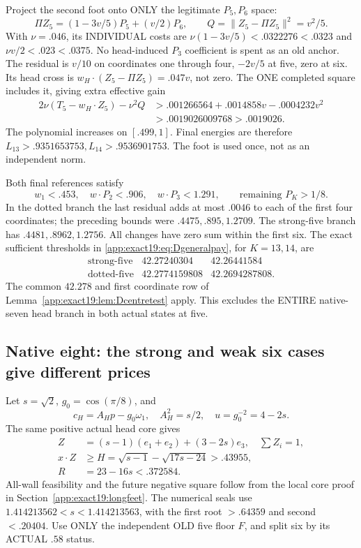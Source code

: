\documentclass[11pt]{article}
\theoremstyle{definition}
\theoremstyle{remark}
\begin{document}
Project the second foot onto ONLY the legitimate \(P_5,P_6\) space:
\[
 \Pi Z_5=(1-3v/5)P_5+(v/2)P_6,\qquad
                         Q=\|Z_5-\Pi Z_5\|^2=v^2/5 .
\]
With \(\nu=.046\), its INDIVIDUAL costs are
\(\nu(1-3v/5)<.0322276<.0323\) and \(\nu v/2<.023<.0375\).
No head-induced \(P_3\) coefficient is spent as an old anchor.
The residual is \(v/10\) on coordinates one through four, \(-2v/5\)
at five, zero at six. Its head cross is
\(w_H\cdot(Z_5-\Pi Z_5)=.047v\), not zero.
The ONE completed square includes it, giving extra effective gain
\[
\begin{split}
 2\nu(T_5-w_H\cdot Z_5)-\nu^2Q
  &>.001266564+.0014858v-.0004232v^2\\
  &>.0019026009768>.0019026 .
\end{split}
\]
The polynomial increases on \([.499,1]\).
Final energies are therefore
\(L_{13}>.9351653753,L_{14}>.9536901753\).
The foot is used once, not as an independent norm.

Both final references satisfy
\[
 w_1<.453,\quad w\cdot P_2<.906,\quad w\cdot P_3<1.291,
                                       \qquad \text{remaining }P_K>1/8 .
\]
In the dotted branch the last residual adds at most \(.0046\) to each
of the first four coordinates; the preceding bounds were
\(.4475,.895,1.2709\). The strong-five branch has
\(.4481,.8962,1.2756\).
All changes have zero sum within the first six.
The exact sufficient thresholds in
\eqref{app:exact19:eq:Dgeneralpay}, for \(K=13,14\), are
\[
\begin{array}{c|cc}
 \text{strong-five}&42.27240304&42.26441584\\
 \text{dotted-five}&42.2774159808&42.2694287808 .
\end{array}
\]
The common \(42.278\) and first coordinate row of
Lemma~\ref{app:exact19:lem:Dcentretest} apply.
This excludes the ENTIRE native-seven head branch in both actual states
at five.

\subsection{Native eight: the strong and weak six cases give different prices}
\label{app:exact19:Deightreference}

Let \(s=\sqrt2\), \(g_0=\cos(\pi/8)\), and
\[
 c_H=A_Hp-g_0\omega_1,\quad A_H^2=s/2,\quad
                         u=g_0^{-2}=4-2s .
\]
The same positive actual head core gives
\[
\begin{split}
 Z&=(s-1)(e_1+e_2)+(3-2s)e_3,\quad\sum Z_i=1,\\
 x\cdot Z&\ge H=\sqrt{s-1}-\sqrt{17s-24}>.43955,\\
 R&=23-16s<.372584 .
\end{split}
\]
All-wall feasibility and the future negative square follow from the
local core proof in Section~\ref{app:exact19:longfeet}.
The numerical seals use \(1.414213562<s<1.414213563\), with the
first root \(>.64359\) and second \(<.20404\).
Use ONLY the independent OLD five floor \(F\), and split six by its
ACTUAL \(.58\) status.
\end{document}
